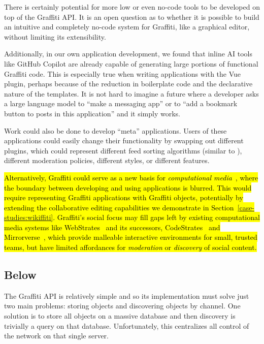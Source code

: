 There is certainly potential for more low or even no-code tools
to be developed on top of the Graffiti API. It is an open
question as to whether it is possible to build an intuitive and completely
no-code system for Graffiti, like a graphical editor, without limiting
its extensibility.

Additionally, in our own application development,
we found that inline AI tools like GitHub Copilot are already
capable of generating large portions of functional Graffiti code.
This is especially true when writing applications with the
Vue plugin, perhaps because of the reduction in boilerplate
code and the declarative nature of the templates.
It is not hard to imagine a future where a developer asks
a large language model to ``make a messaging app''
or to ``add a bookmark button to posts in this application'' and
it simply works.

Work could also be done to develop ``meta'' applications.
Users of these applications could easily change their functionality
by swapping out different plugins,
which could represent different feed sorting algorithms
(similar to \cite{threeleggedstool, bluesky}),
different moderation policies, different styles,
or different features.

\hl{%
Alternatively, Graffiti could serve as a new basis for
\emph{computational media}~{\cite{computationalmedia}},
where the boundary between developing and using applications is blurred.
This would require representing Graffiti applications with
Graffiti objects, potentially by extending the
collaborative editing capabilities we demonstrate in Section~{\ref{case-studies:wikiffiti}}.
Graffiti's social focus may fill gaps left by existing computational media
systems like WebStrates~{\cite{webstrates}} and its successors, CodeStrates~{\cite{codestrates}}
and Mirrorverse~{\cite{mirrorverse}}, which provide malleable interactive environments
for small, trusted teams, but have limited affordances
for \emph{moderation} or \emph{discovery} of social content.
}%

\subsection{Below}

The Graffiti API is relatively simple
and so its implementation must solve just two main problems:
storing objects and discovering objects by channel.
One solution is to store all objects on a massive database
and then discovery is trivially a query on that database.
Unfortunately, this centralizes all control of the network
on that single server.

